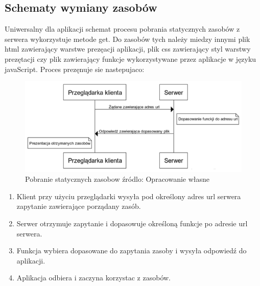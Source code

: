 \documentclass[12pt]{report}
\begin{document}
\subsection{Schematy wymiany zasobów}
Uniwersalny dla aplikacji schemat procesu pobrania statycznych zasobów z serwera wykorzystuje metode get. Do zasobów tych należy miedzy innymi plik html zawierający warstwe prezęacji aplikacji, plik css zawierający styl warstwy prezętacji czy plik zawierający funkcje wykorzystywane przez aplikacje w języku javaScript. Proces prezęnuje sie nastepujaco:
\begin{figure}[!hb]
\centering
\includegraphics[width=\textwidth,height=\textheight,keepaspectratio]{K-S.png} 
\caption{Pobranie statycznych zasobow źródlo: Opracowanie własne}
\end{figure}
\begin{enumerate}
\item Klient przy użyciu przeglądarki wysyła pod określony adres url serwera zapytanie zawierające porządany zasób.
\item Serwer otrzymuje zapytanie i dopasowuje określoną funkcje po adresie url serwera.
\item Funkcja wybiera dopasowane do zapytania zasoby i wysyła odpowiedź do aplikacji.
\item Aplikacja odbiera i zaczyna korzystac z zasobów.
\end{enumerate}
\end{document}
